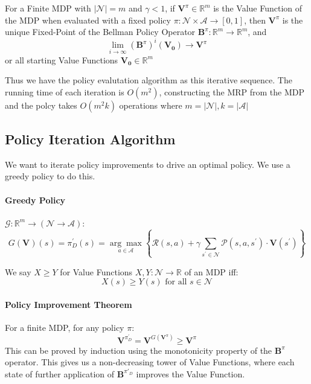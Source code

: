 \documentclass[11pt]{article}
\begin{document}
For a Finite MDP with $|\mathcal{N}|=m$ and $\gamma<1$, if $\boldsymbol{V}^\pi \in \mathbb{R}^m$ is the Value Function of the MDP when evaluated with a fixed policy
$\pi: \mathcal{N} \times \mathcal{A} \rightarrow[0,1]$, then $\boldsymbol{V}^\pi$ is the unique Fixed-Point of the Bellman Policy Operator $\boldsymbol{B}^\pi: \mathbb{R}^m \rightarrow \mathbb{R}^m$, and
$$
\lim _{i \rightarrow \infty}\left(\boldsymbol{B}^\pi\right)^i\left(\boldsymbol{V}_{\mathbf{0}}\right) \rightarrow \boldsymbol{V}^\pi
$$
or all starting Value Functions $\boldsymbol{V}_{\mathbf{0}} \in \mathbb{R}^m$

Thus we have the policy evalutation algorithm as this iterative sequence. The running time of each iteration is $O(m^2)$, constructing the MRP from the MDP and the polcy takes $O(m^2k)$ operations where $m = |\mathcal{N}|, k = |\mathcal{A}|$

\subsection*{Policy Iteration Algorithm}
We want to iterate policy improvements to drive an optimal policy. We use a greedy policy to do this. 
\paragraph*{Greedy Policy}
$\mathcal{G}:\mathbb{R}^m\rightarrow(\mathcal{N}\rightarrow\mathcal{A})$:
$$
G(\boldsymbol{V})(s)=\pi_D^{\prime}(s)=\underset{a \in \mathcal{A}}{\arg \max }\left\{\mathcal{R}(s, a)+\gamma \sum_{s^{\prime} \in \mathcal{N}} \mathcal{P}\left(s, a, s^{\prime}\right) \cdot \boldsymbol{V}\left(s^{\prime}\right)\right\}
$$

We say $X \geq Y$ for Value Functions $X, Y: \mathcal{N} \rightarrow \mathbb{R}$ of an MDP iff:
$$
X(s) \geq Y(s) \text { for all } s \in \mathcal{N}
$$

\paragraph*{Policy Improvement Theorem}
For a finite MDP, for any policy $\pi$:
$$
\boldsymbol{V}^{\pi_D^{\prime}}=\boldsymbol{V}^{G\left(\boldsymbol{V}^\pi\right)} \geq \boldsymbol{V}^\pi
$$
This can be proved by induction using the monotonicity property of the $\boldsymbol{B}^\pi$ operator.
This gives us a non-decreasing tower of Value Functions, where each state of further application of $\boldsymbol{B}^{\pi'_D}$ improves the Value Function. 
\end{document}
